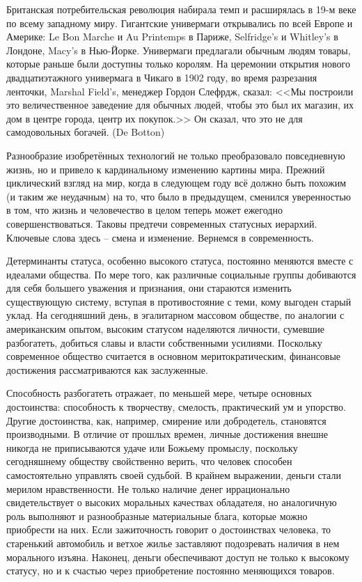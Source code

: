 Британская потребительская революция набирала темп и расширялась в 19-м веке
по всему западному миру. Гигантские универмаги открывались по всей Европе и
Америке: Le Bon Marche и Au Printemps в Париже, Selfridge's и Whitley's в
Лондоне, Macy's в Нью-Йорке. Универмаги предлагали обычным людям товары,
которые раньше были доступны только королям. На церемонии открытия нового
двадцатиэтажного универмага в Чикаго в 1902 году, во время разрезания ленточки,
Marshal Field's, менеджер Гордон Слефрдж, сказал: <<Мы построили это
величественное заведение для обычных людей, чтобы это был их магазин, их дом в
центре города, центр их покупок.>> Он сказал, что это не для самодовольных
богачей. (De Botton)

Разнообразие изобретённых технологий не только преобразовало повседневную жизнь,
но и привело к кардинальному изменению картины мира. Прежний циклический взгляд
на мир, когда в следующем году всё должно быть похожим (и таким же неудачным)
на то, что было в предыдущем, сменился уверенностью в том, что жизнь и
человечество в целом теперь может ежегодно совершенствоваться. Таковы предтечи
современных статусных иерархий. Ключевые слова здесь -- смена и изменение.
Вернемся в современность.

Детерминанты статуса, особенно высокого статуса, постоянно меняются вместе с
идеалами общества. По мере того, как различные социальные группы добиваются для
себя большего уважения и признания, они стараются изменить существующую систему,
вступая в противостояние с теми, кому выгоден старый уклад. На сегодняшний день,
в эгалитарном массовом обществе, по аналогии с американским опытом, высоким
статусом  наделяются личности, сумевшие разбогатеть, добиться славы и власти
собственными усилиями. Поскольку современное общество считается в основном
меритократическим, финансовые достижения рассматриваются как заслуженные.

Способность разбогатеть отражает, по меньшей мере, четыре основных достоинства:
способность к творчеству, смелость, практический ум и упорство. Другие
достоинства, как, например, смирение или добродетель, становятся производными.
В отличие от прошлых времен, личные достижения внешне никогда не приписываются
удаче или Божьему промыслу, поскольку сегодняшнему обществу свойственно верить,
что человек способен самостоятельно управлять своей судьбой. В крайнем выражении,
деньги стали мерилом нравственности. Не только наличие денег иррационально
свидетельствует о высоких моральных качествах обладателя, но аналогичную роль
выполняют и разнообразные материальные блага, которые можно приобрести на них.
Если зажиточность говорит о достоинствах человека, то старенький автомобиль и
ветхое жилье заставляют подозревать наличия в нем морального изъяна. Наконец,
деньги обеспечивают доступ не только к высокому статусу, но и к счастью через
приобретение постоянно меняющихся товаров.

